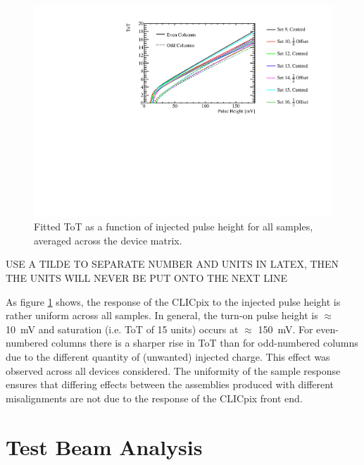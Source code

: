 \begin{figure}
\centering
\includegraphics[width=1.0\textwidth]{CLICdpVertex/Plots/TestPulseCalibration/FitParam/AverageToT_vs_InjectedPulseHeight.pdf}
\caption[Fitted CLICpix ToT as a function of injected pulse height averaged across the device matrix.]{Fitted ToT as a function of injected pulse height for all samples, averaged across the device matrix.}
\label{fig:testpulsemeanfit}
\end{figure}

USE A TILDE TO SEPARATE NUMBER AND UNITS IN LATEX, THEN THE UNITS WILL NEVER BE PUT ONTO THE NEXT LINE

As figure \ref{fig:testpulsemeanfit} shows, the response of the CLICpix to the injected pulse height is rather uniform across all samples.  In general, the turn-on pulse height is $\approx$ 10~mV and saturation (i.e. ToT of 15 units) occurs at $\approx$ 150~mV.  For even-numbered columns there is a sharper rise in ToT than for odd-numbered columns due to the different quantity of (unwanted) injected charge. This effect was observed across all devices considered. The uniformity of the sample response ensures that differing effects between the assemblies produced with different misalignments are not due to the response of the CLICpix front end.


\section{Test Beam Analysis}
\label{sec:testbeam}

